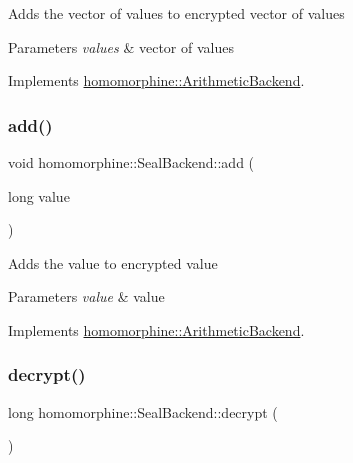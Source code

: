 Adds the vector of values to encrypted vector of values


\begin{DoxyParams}{Parameters}
{\em values} & vector of values \\
\hline
\end{DoxyParams}


Implements \hyperlink{classhomomorphine_1_1_arithmetic_backend_abf4053e05f07e566e9563a75f516daf6}{homomorphine\+::\+Arithmetic\+Backend}.

\mbox{\label{classhomomorphine_1_1_seal_backend_acbff51d94165f4e578cafaeb965e4367}} 
\subsubsection{\texorpdfstring{add()}{add()}\hspace{0.1cm}{\footnotesize\ttfamily [2/2]}}
{\footnotesize\ttfamily void homomorphine\+::\+Seal\+Backend\+::add (\begin{DoxyParamCaption}\item[{long}]{value }\end{DoxyParamCaption})\hspace{0.3cm}{\ttfamily [virtual]}}

Adds the value to encrypted value


\begin{DoxyParams}{Parameters}
{\em value} & value \\
\hline
\end{DoxyParams}


Implements \hyperlink{classhomomorphine_1_1_arithmetic_backend_aa1c88ebc894527a72a9fdbd35ca14204}{homomorphine\+::\+Arithmetic\+Backend}.

\mbox{\label{classhomomorphine_1_1_seal_backend_a0496053defd79b8bd42d4d9c6b4b4ccc}} 
\subsubsection{\texorpdfstring{decrypt()}{decrypt()}}
{\footnotesize\ttfamily long homomorphine\+::\+Seal\+Backend\+::decrypt (\begin{DoxyParamCaption}{ }\end{DoxyParamCaption})\hspace{0.3cm}{\ttfamily [virtual]}}

